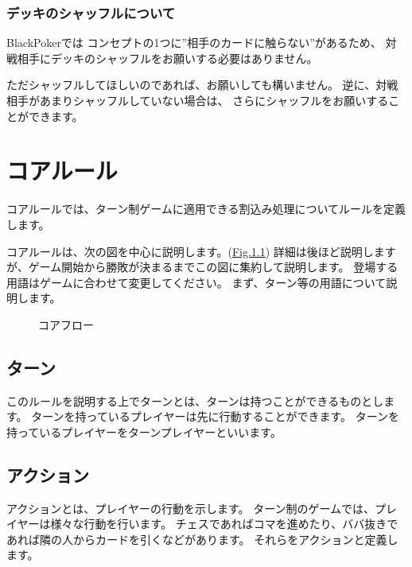 \documentclass[letterpaper,10pt,dvipdfmx]{sphinxmanual}
\begin{document}
\subsection{デッキのシャッフルについて}
\label{\detokenize{common/07-etc:id3}}
BlackPokerでは
コンセプトの1つに”相手のカードに触らない”があるため、
対戦相手にデッキのシャッフルをお願いする必要はありません。

ただシャッフルしてほしいのであれば、お願いしても構いません。
逆に、対戦相手があまりシャッフルしていない場合は、
さらにシャッフルをお願いすることができます。


\chapter{コアルール}
\label{\detokenize{core/core:id1}}\label{\detokenize{core/core::doc}}
コアルールでは、ターン制ゲームに適用できる割込み処理についてルールを定義します。

コアルールは、次の図を中心に説明します。(\hyperref[\detokenize{core/core:coreflow-1}]{Fig.\@ \ref{\detokenize{core/core:coreflow-1}}})
詳細は後ほど説明しますが、ゲーム開始から勝敗が決まるまでこの図に集約して説明します。
登場する用語はゲームに合わせて変更してください。
まず、ターン等の用語について説明します。

\begin{figure}[htbp]
\centering
\capstart

\noindent{}
\caption{コアフロー}\label{\detokenize{core/core:id16}}\label{\detokenize{core/core:coreflow-1}}\end{figure}


\section{ターン}
\label{\detokenize{core/core:id2}}
このルールを説明する上でターンとは、ターンは持つことができるものとします。
ターンを持っているプレイヤーは先に行動することができます。
ターンを持っているプレイヤーをターンプレイヤーといいます。


\section{アクション}
\label{\detokenize{core/core:id3}}
アクションとは、プレイヤーの行動を示します。
ターン制のゲームでは、プレイヤーは様々な行動を行います。
チェスであればコマを進めたり、ババ抜きであれば隣の人からカードを引くなどがあります。
それらをアクションと定義します。
\end{document}
